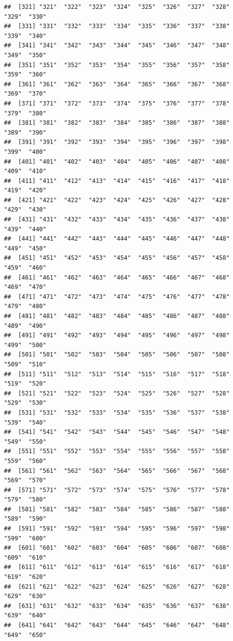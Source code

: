 \documentclass[]{book}
\begin{document}
\begin{verbatim}
##  [321] "321"  "322"  "323"  "324"  "325"  "326"  "327"  "328"  "329"  "330" 
##  [331] "331"  "332"  "333"  "334"  "335"  "336"  "337"  "338"  "339"  "340" 
##  [341] "341"  "342"  "343"  "344"  "345"  "346"  "347"  "348"  "349"  "350" 
##  [351] "351"  "352"  "353"  "354"  "355"  "356"  "357"  "358"  "359"  "360" 
##  [361] "361"  "362"  "363"  "364"  "365"  "366"  "367"  "368"  "369"  "370" 
##  [371] "371"  "372"  "373"  "374"  "375"  "376"  "377"  "378"  "379"  "380" 
##  [381] "381"  "382"  "383"  "384"  "385"  "386"  "387"  "388"  "389"  "390" 
##  [391] "391"  "392"  "393"  "394"  "395"  "396"  "397"  "398"  "399"  "400" 
##  [401] "401"  "402"  "403"  "404"  "405"  "406"  "407"  "408"  "409"  "410" 
##  [411] "411"  "412"  "413"  "414"  "415"  "416"  "417"  "418"  "419"  "420" 
##  [421] "421"  "422"  "423"  "424"  "425"  "426"  "427"  "428"  "429"  "430" 
##  [431] "431"  "432"  "433"  "434"  "435"  "436"  "437"  "438"  "439"  "440" 
##  [441] "441"  "442"  "443"  "444"  "445"  "446"  "447"  "448"  "449"  "450" 
##  [451] "451"  "452"  "453"  "454"  "455"  "456"  "457"  "458"  "459"  "460" 
##  [461] "461"  "462"  "463"  "464"  "465"  "466"  "467"  "468"  "469"  "470" 
##  [471] "471"  "472"  "473"  "474"  "475"  "476"  "477"  "478"  "479"  "480" 
##  [481] "481"  "482"  "483"  "484"  "485"  "486"  "487"  "488"  "489"  "490" 
##  [491] "491"  "492"  "493"  "494"  "495"  "496"  "497"  "498"  "499"  "500" 
##  [501] "501"  "502"  "503"  "504"  "505"  "506"  "507"  "508"  "509"  "510" 
##  [511] "511"  "512"  "513"  "514"  "515"  "516"  "517"  "518"  "519"  "520" 
##  [521] "521"  "522"  "523"  "524"  "525"  "526"  "527"  "528"  "529"  "530" 
##  [531] "531"  "532"  "533"  "534"  "535"  "536"  "537"  "538"  "539"  "540" 
##  [541] "541"  "542"  "543"  "544"  "545"  "546"  "547"  "548"  "549"  "550" 
##  [551] "551"  "552"  "553"  "554"  "555"  "556"  "557"  "558"  "559"  "560" 
##  [561] "561"  "562"  "563"  "564"  "565"  "566"  "567"  "568"  "569"  "570" 
##  [571] "571"  "572"  "573"  "574"  "575"  "576"  "577"  "578"  "579"  "580" 
##  [581] "581"  "582"  "583"  "584"  "585"  "586"  "587"  "588"  "589"  "590" 
##  [591] "591"  "592"  "593"  "594"  "595"  "596"  "597"  "598"  "599"  "600" 
##  [601] "601"  "602"  "603"  "604"  "605"  "606"  "607"  "608"  "609"  "610" 
##  [611] "611"  "612"  "613"  "614"  "615"  "616"  "617"  "618"  "619"  "620" 
##  [621] "621"  "622"  "623"  "624"  "625"  "626"  "627"  "628"  "629"  "630" 
##  [631] "631"  "632"  "633"  "634"  "635"  "636"  "637"  "638"  "639"  "640" 
##  [641] "641"  "642"  "643"  "644"  "645"  "646"  "647"  "648"  "649"  "650" 

\end{verbatim}
\end{document}
